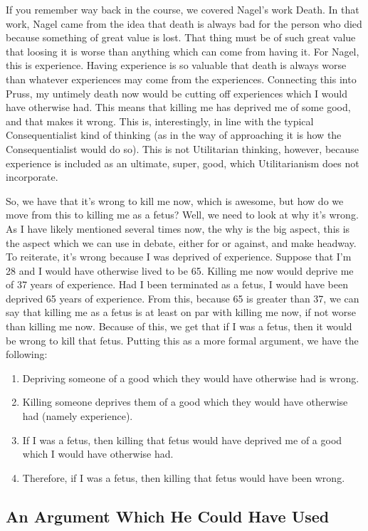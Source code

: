 If you remember way back in the course, we covered Nagel's work Death. In that work, Nagel came from the idea that death is always bad for the person who died because something of great value is lost. That thing must be of such great value that loosing it is worse than anything which can come from having it. For Nagel, this is experience. Having experience is so valuable that death is always worse than whatever experiences may come from the experiences. Connecting this into Pruss, my untimely death now would be cutting off experiences which I would have otherwise had. This means that killing me has deprived me of some good, and that makes it wrong. This is, interestingly, in line with the typical Consequentialist kind of thinking (as in the way of approaching it is how the Consequentialist would do so). This is not Utilitarian thinking, however, because experience is included as an ultimate, super, good, which Utilitarianism does not incorporate.

So, we have that it's wrong to kill me now, which is awesome, but how do we move from this to killing me as a fetus? Well, we need to look at why it's wrong. As I have likely mentioned several times now, the why is the big aspect, this is the aspect which we can use in debate, either for or against, and make headway. To reiterate, it's wrong because I was deprived of experience. Suppose that I'm 28 and I would have otherwise lived to be 65. Killing me now would deprive me of 37 years of experience. Had I been terminated as a fetus, I would have been deprived 65 years of experience. From this, because 65 is greater than 37, we can say that killing me as a fetus is at least on par with killing me now, if not worse than killing me now. Because of this, we get that if I was a fetus, then it would be wrong to kill that fetus. Putting this as a more formal argument, we have the following:
\begin{enumerate}
    \item Depriving someone of a good which they would have otherwise had is wrong. 
    \item Killing someone deprives them of a good which they would have otherwise had (namely experience). 
    \item If I was a fetus, then killing that fetus would have deprived me of a good which I would have otherwise had.
    \item Therefore, if I was a fetus, then killing that fetus would have been wrong. 
\end{enumerate}
\subsection{An Argument Which He Could Have Used}

